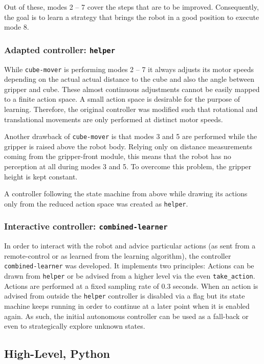 Out of these, modes 2 -- 7 cover the steps that are to be improved. Consequently, the goal is to learn a strategy that brings the robot in a good position to execute mode 8.

\subsubsection{Adapted controller: \texttt{helper}}
While \texttt{cube-mover} is performing modes 2 -- 7 it always adjusts its motor speeds depending on the actual actual distance to the cube and also the angle between gripper and cube. These almost continuous adjustments cannot be easily mapped to a finite action space. A small action space is desirable for the purpose of learning. Therefore, the original controller was modified such that rotational and translational movements are only performed at distinct motor speeds.

Another drawback of \texttt{cube-mover} is that modes 3 and 5 are performed while the gripper is raised above the robot body. Relying only on distance measurements coming from the gripper-front module, this means that the robot has no perception at all during modes 3 and 5. To overcome this problem, the gripper height is kept constant.

A controller following the state machine from above while drawing its actions only from the reduced action space was created as \texttt{helper}.

\subsubsection{Interactive controller: \texttt{combined-learner}}
In order to interact with the robot and advice particular actions (as sent from a remote-control or as learned from the learning algorithm), the controller \texttt{combined-learner} was developed. It implements two principles: Actions can be drawn from \texttt{helper} or be advised from a higher level via the even \texttt{take\_action}. Actions are performed at a fixed sampling rate of 0.3 seconds. When an action is advised from outside the \texttt{helper} controller is disabled via a flag but its state machine keeps running in order to continue at a later point when it is enabled again. As such, the initial autonomous controller can be used as a fall-back or even to strategically explore unknown states.


\subsection{High-Level, Python}


